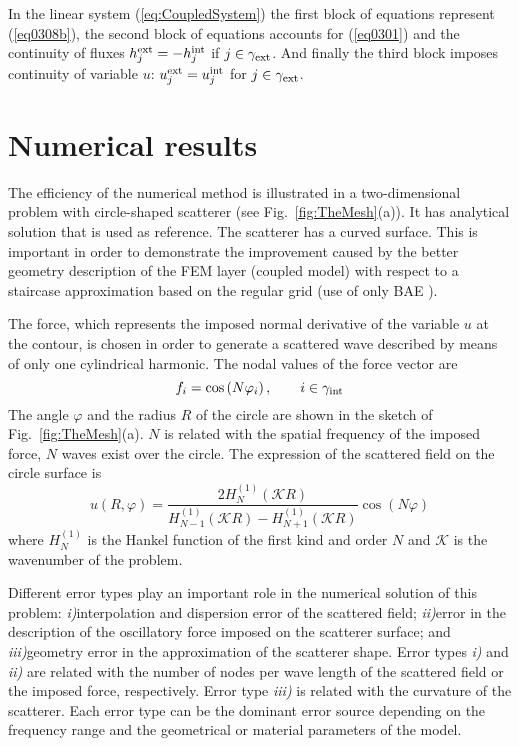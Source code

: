 \documentclass[12pt]{article}
\newcommand{\rin}{{\rm int}}
\newcommand{\rex}{{\rm ext}}
\newcommand{\K}{\mathcal{K}}
\newcommand{\fref}[1]{Fig.~\ref{#1}}
\begin{document}
In the linear system (\ref{eq:CoupledSystem}) the first block of equations represent (\ref{eq0308b}), the second block of equations accounts for (\ref{eq0301}) and the continuity of fluxes $h^\rex_j = - h^\rin_j$ if $j \in \gamma_\rex$. And finally the third block imposes continuity of variable $u$: $u^\rex_j = u^\rin_j$ for $j \in \gamma_\rex$.






\section{Numerical results}
\label{sec:NumericalExamples}

The efficiency of the numerical method is illustrated in a two-dimensional problem with circle-shaped scatterer (see \fref{fig:TheMesh}(a)). It has analytical solution that is used as reference. The scatterer has a curved surface. This is important in order to demonstrate the improvement caused by the better geometry description of the FEM layer (coupled model) with respect to a staircase approximation based on the regular grid (use of only BAE \cite{poblet-PVS:2015}).


The force, which represents the imposed normal derivative of the variable $u$ at the contour, is chosen in order to generate a scattered wave described by means of only one cylindrical harmonic. The nodal values of the force vector are
\begin{equation}
 f_{i} = \cos\left( N \varphi_{i} \right), \qquad i \in \gamma_\rin
\end{equation}
The angle $\varphi$ and the radius $R$ of the circle are shown in the sketch of \fref{fig:TheMesh}(a). $N$ is related with the spatial frequency of the imposed force,  $N$ waves exist over the circle. The expression of the scattered field on the circle surface is
\begin{equation}\label{eq:AnalyticalSolution}
 u(R,\varphi) = \frac{2 H_{N}^{(1)}\left( \K R\right)}{H_{N-1}^{(1)}\left( \K R\right) - H_{N+1}^{(1)}\left( \K R\right)} \cos\left( N \varphi \right)
\end{equation}
where $H_{N}^{(1)}$ is the Hankel function of the first kind and order $N$ and $\K$ is the wavenumber of the problem.

Different error types play an important role in the numerical solution of this problem: \textit{i)}interpolation and dispersion error of the scattered field; \textit{ii)}error in the description of the oscillatory force imposed on the scatterer surface; and \textit{iii)}geometry error in the approximation of the scatterer shape. Error types \textit{i)} and \textit{ii)} are related with the number of nodes per wave length of the scattered field or the imposed force, respectively. Error type \textit{iii)} is related with the curvature of the scatterer. Each error type can be the dominant error source depending on the frequency range and the geometrical or material parameters of the model.
\end{document}
